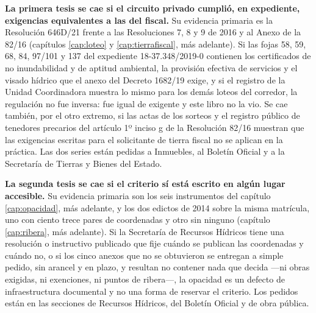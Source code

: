 \textbf{La primera tesis se cae si el circuito privado cumplió, en expediente, exigencias equivalentes a las del fiscal.} Su evidencia primaria es la Resolución 646D/21 frente a las Resoluciones 7, 8 y 9 de 2016 y al Anexo de la 82/16 (capítulos \ref{cap:loteo} y \ref{cap:tierrafiscal}, más adelante). Si las fojas 58, 59, 68, 84, 97/101 y 137 del expediente 18-37.348/2019-0 contienen los certificados de no inundabilidad y de aptitud ambiental, la provisión efectiva de servicios y el visado hídrico que el anexo del Decreto 1682/19 exige, y si el registro de la Unidad Coordinadora muestra lo mismo para los demás loteos del corredor, la regulación no fue inversa: fue igual de exigente y este libro no la vio. Se cae también, por el otro extremo, si las actas de los sorteos y el registro público de tenedores precarios del artículo 1º inciso g de la Resolución 82/16 muestran que las exigencias escritas para el solicitante de tierra fiscal no se aplican en la práctica. Las dos series están pedidas a Inmuebles, al Boletín Oficial y a la Secretaría de Tierras y Bienes del Estado.

\textbf{La segunda tesis se cae si el criterio sí está escrito en algún lugar accesible.} Su evidencia primaria son los seis instrumentos del capítulo \ref{cap:opacidad}, más adelante, y los dos edictos de 2014 sobre la misma matrícula, uno con ciento trece pares de coordenadas y otro sin ninguno (capítulo \ref{cap:ribera}, más adelante). Si la Secretaría de Recursos Hídricos tiene una resolución o instructivo publicado que fije cuándo se publican las coordenadas y cuándo no, o si los cinco anexos que no se obtuvieron se entregan a simple pedido, sin arancel y en plazo, y resultan no contener nada que decida ---ni obras exigidas, ni exenciones, ni puntos de ribera---, la opacidad es un defecto de infraestructura documental y no una forma de reservar el criterio. Los pedidos están en las secciones de Recursos Hídricos, del Boletín Oficial y de obra pública.

